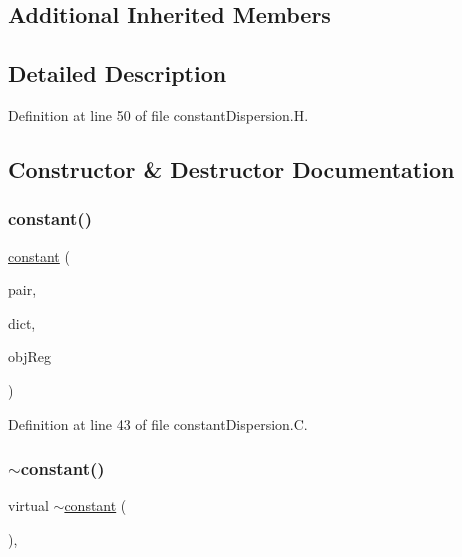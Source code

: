 \subsection*{Additional Inherited Members}


\subsection{Detailed Description}


Definition at line 50 of file constant\+Dispersion.\+H.



\subsection{Constructor \& Destructor Documentation}
\mbox{\label{classFoam_1_1dispersionModels_1_1constant_a7c8caf735eb605390377e923eb18fc02}} 
\subsubsection{\texorpdfstring{constant()}{constant()}}
{\footnotesize\ttfamily \hyperlink{classFoam_1_1dispersionModels_1_1constant}{constant} (\begin{DoxyParamCaption}\item[{const \hyperlink{classFoam_1_1FFPair}{F\+F\+Pair} \&}]{pair,  }\item[{const dictionary \&}]{dict,  }\item[{const object\+Registry \&}]{obj\+Reg }\end{DoxyParamCaption})}



Definition at line 43 of file constant\+Dispersion.\+C.

\mbox{\label{classFoam_1_1dispersionModels_1_1constant_a4c0b4ac091f31d044388ec654d4d9c07}} 
\subsubsection{\texorpdfstring{$\sim$constant()}{~constant()}}
{\footnotesize\ttfamily virtual $\sim$\hyperlink{classFoam_1_1dispersionModels_1_1constant}{constant} (\begin{DoxyParamCaption}{ }\end{DoxyParamCaption})\hspace{0.3cm}{\ttfamily [inline]}, {\ttfamily [virtual]}}



